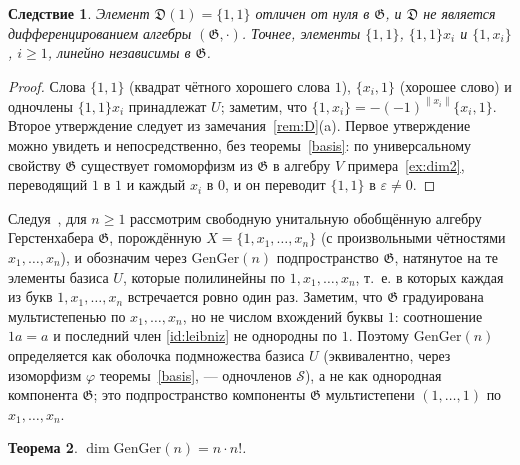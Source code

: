 \documentclass[11pt,reqno]{amsart}
\newcommand{\G}{\mathfrak G}
\newcommand{\D}{\mathfrak D}
\newcommand{\Sm}{\mathcal S}
\newcommand{\rp}[1]{\|#1\|}
\theoremstyle{plain}
\newtheorem{theorem}{Теорема}
\newtheorem{corollary}[theorem]{Следствие}
\theoremstyle{definition}
\theoremstyle{remark}
\begin{document}
\begin{corollary}\label{cor:11}
Элемент $\D(1)=\{1,1\}$ отличен от нуля в $\G$, и $\D$ не является дифференцированием алгебры $(\G,\cdot)$.
Точнее, элементы $\{1,1\}$, $\{1,1\}x_i$ и $\{1,x_i\}$, $i\ge1$, линейно независимы в $\G$.
\end{corollary}

\begin{proof}
Слова $\{1,1\}$ (квадрат чётного хорошего слова $1$), $\{x_i,1\}$ (хорошее слово) и одночлены $\{1,1\}x_i$ принадлежат $U$; заметим, что $\{1,x_i\}=-(-1)^{\rp{x_i}}\{x_i,1\}$.
Второе утверждение следует из замечания~\ref{rem:D}(a).
Первое утверждение можно увидеть и непосредственно, без теоремы~\ref{basis}: по универсальному свойству $\G$ существует гомоморфизм из $\G$ в алгебру $V$ примера~\ref{ex:dim2}, переводящий $1$ в $1$ и каждый $x_i$ в $0$, и он переводит $\{1,1\}$ в $\varepsilon\ne0$.
\end{proof}

Следуя~\cite{K17}, для $n\ge1$ рассмотрим свободную унитальную обобщённую алгебру Герстенхабера $\G$, порождённую $X=\{1,x_1,\dots,x_n\}$ (с произвольными чётностями $x_1,\dots,x_n$), и обозначим через $\mathrm{GenGer}(n)$ подпространство $\G$, натянутое на те элементы базиса $U$, которые полилинейны по $1,x_1,\dots,x_n$, т.~е. в которых каждая из букв $1,x_1,\dots,x_n$ встречается ровно один раз.
Заметим, что $\G$ градуирована мультистепенью по $x_1,\dots,x_n$, но не числом вхождений буквы $1$: соотношение $1a=a$ и последний член \eqref{id:leibniz} не однородны по $1$.
Поэтому $\mathrm{GenGer}(n)$ определяется как оболочка подмножества базиса $U$ (эквивалентно, через изоморфизм $\varphi$ теоремы~\ref{basis}, --- одночленов $\Sm$), а не как однородная компонента $\G$; это подпространство компоненты $\G$ мультистепени $(1,\dots,1)$ по $x_1,\dots,x_n$.

\begin{theorem}\label{dimen}
$\dim\mathrm{GenGer}(n)=n\cdot n!$.
\end{theorem}
\end{document}
